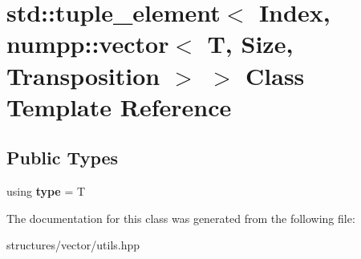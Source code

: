 \hypertarget{classstd_1_1tuple__element_3_01Index_00_01numpp_1_1vector_3_01T_00_01Size_00_01Transposition_01_4_01_4}{}\section{std\+:\+:tuple\+\_\+element$<$ Index, numpp\+:\+:vector$<$ T, Size, Transposition $>$ $>$ Class Template Reference}
\label{classstd_1_1tuple__element_3_01Index_00_01numpp_1_1vector_3_01T_00_01Size_00_01Transposition_01_4_01_4}
\subsection*{Public Types}
\begin{DoxyCompactItemize}
\item 
\mbox{\label{classstd_1_1tuple__element_3_01Index_00_01numpp_1_1vector_3_01T_00_01Size_00_01Transposition_01_4_01_4_af0a1fb2c7e214c8513f8dbcc35d80cd9}} 
using {\bfseries type} = T
\end{DoxyCompactItemize}


The documentation for this class was generated from the following file\+:\begin{DoxyCompactItemize}
\item 
structures/vector/utils.\+hpp\end{DoxyCompactItemize}
